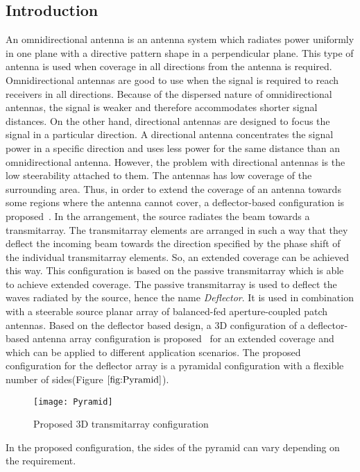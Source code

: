 \documentclass[titlepage]{article}
\begin{document}
\subsection{Introduction}
An omnidirectional antenna is an antenna system which radiates power uniformly in one plane with a directive pattern shape in a perpendicular plane. This type of antenna is used when coverage in all directions from the antenna is required. Omnidirectional antennas are good to use when the signal is required to reach receivers in all directions. Because of the dispersed nature of omnidirectional antennas, the signal is weaker and therefore accommodates shorter signal distances.
\newline
On the other hand, directional antennas are designed to focus the signal in a particular direction. A directional antenna concentrates the signal power in a specific direction and uses less power for the same distance than an omnidirectional antenna. However, the problem with directional antennas is the low steerability attached to them. The antennas has low coverage of the surrounding area. Thus, in order to extend the coverage of an antenna towards some regions where the antenna cannot cover, a deflector-based configuration is proposed~\cite{4}.
\newline
In the arrangement, the source radiates the beam towards a transmitarray. The transmitarray elements are arranged in such a way that they deflect the incoming beam towards the direction specified by the phase shift of the individual transmitarray elements. So, an extended coverage can be achieved this way. This configuration is based on the passive transmitarray which is able to achieve extended coverage. The passive transmitarray is used to deflect the waves radiated by the source, hence the name \emph{Deflector}. It is used in combination with a steerable source planar array of balanced-fed aperture-coupled patch antennas.
\newline
Based on the deflector based design, a 3D configuration of a deflector-based antenna array configuration is proposed~\cite{4} for an extended coverage and which can be applied to different application scenarios. The proposed configuration for the deflector array is a pyramidal configuration with a flexible number of sides(Figure $\ref{fig:Pyramid}$).
\begin{figure}[!hbp]
\centering
\texttt{[image: Pyramid]}
\caption{Proposed 3D transmitarray configuration}
\label{fig:Pyramid}
\end{figure}
In the proposed configuration, the sides of the pyramid can vary depending on the requirement.
\end{document}
